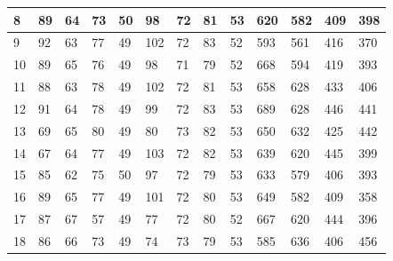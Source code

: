 \documentclass[legalpaper,12pt]{article}
\begin{document}
\begin{table}[htbp]
\begin{tabular}{|l|l|l|l|l|l|l|l|l|l|l|l|l|}
8                                         & 89         & 64        & 73          & 50         & 98         & 72        & 81          & 53         & 620        & 582       & 409         & 398        \\ \hline
9                                         & 92         & 63        & 77          & 49         & 102        & 72        & 83          & 52         & 593        & 561       & 416         & 370        \\ \hline
10                                        & 89         & 65        & 76          & 49         & 98         & 71        & 79          & 52         & 668        & 594       & 419         & 393        \\ \hline
11                                        & 88         & 63        & 78          & 49         & 102        & 72        & 81          & 53         & 658        & 628       & 433         & 406        \\ \hline
12                                        & 91         & 64        & 78          & 49         & 99         & 72        & 83          & 53         & 689        & 628       & 446         & 441        \\ \hline
13                                        & 69         & 65        & 80          & 49         & 80         & 73        & 82          & 53         & 650        & 632       & 425         & 442        \\ \hline
14                                        & 67         & 64        & 77          & 49         & 103        & 72        & 82          & 53         & 639        & 620       & 445         & 399        \\ \hline
15                                        & 85         & 62        & 75          & 50         & 97         & 72        & 79          & 53         & 633        & 579       & 406         & 393        \\ \hline
16                                        & 89         & 65        & 77          & 49         & 101        & 72        & 80          & 53         & 649        & 582       & 409         & 358        \\ \hline
17                                        & 87         & 67        & 57          & 49         & 77         & 72        & 80          & 52         & 667        & 620       & 444         & 396        \\ \hline
18                                        & 86         & 66        & 73          & 49         & 74         & 73        & 79          & 53         & 585        & 636       & 406         & 456        \\ \hline

\end{tabular}
\end{table}
\end{document}
